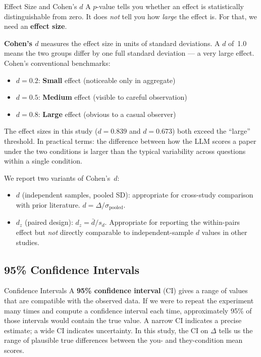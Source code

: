 \documentclass[12pt, letterpaper]{article}
\newcommand{\cohen}{Cohen's~$d$}
\begin{document}
\begin{keyconcept}{Effect Size and Cohen's $d$}
  A $p$-value tells you whether an effect is statistically distinguishable from zero.
  It does \emph{not} tell you how \emph{large} the effect is. For that, we need an
  \textbf{effect size}.

  \textbf{Cohen's $d$} measures the effect size in units of standard deviations.
  A $d$ of~1.0 means the two groups differ by one full standard deviation --- a very
  large effect. Cohen's conventional benchmarks:
  \begin{itemize}[noitemsep]
    \item $d = 0.2$: \textbf{Small} effect (noticeable only in aggregate)
    \item $d = 0.5$: \textbf{Medium} effect (visible to careful observation)
    \item $d = 0.8$: \textbf{Large} effect (obvious to a casual observer)
  \end{itemize}

  The effect sizes in this study ($d = 0.839$ and $d = 0.673$) both exceed the
  ``large'' threshold. In practical terms: the difference between how the LLM scores
  a paper under the two conditions is larger than the typical variability across
  questions within a single condition.
\end{keyconcept}

We report two variants of \cohen:
\begin{itemize}[noitemsep]
  \item $d$ (independent samples, pooled SD): appropriate for cross-study comparison
        with prior literature. $d = \Delta / \sigma_{\text{pooled}}$.
  \item $d_z$ (paired design): $d_z = \bar{d} / s_d$. Appropriate for reporting the
        within-pairs effect but \emph{not} directly comparable to independent-sample
        $d$ values in other studies.
\end{itemize}

\subsection{95\% Confidence Intervals}

\begin{keyconcept}{Confidence Intervals}
  A \textbf{95\% confidence interval} (CI) gives a range of values that are compatible
  with the observed data. If we were to repeat the experiment many times and compute
  a confidence interval each time, approximately 95\% of those intervals would contain
  the true value. A narrow CI indicates a precise estimate; a wide CI indicates
  uncertainty. In this study, the CI on $\Delta$ tells us the range of plausible
  true differences between the you- and they-condition mean scores.
\end{keyconcept}
\end{document}
